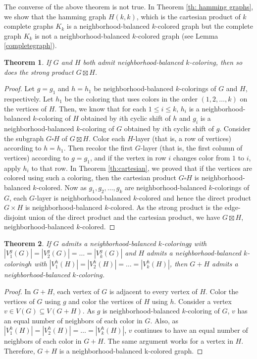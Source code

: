 \documentclass[12pt]{article}
\newtheorem{theorem}{Theorem}[section]
\newcommand{\nbc}{neighborhood-balanced $k$-coloring\xspace}
\newcommand{\nbcs}{neighborhood-balanced $k$-colorings\xspace}
\newcommand{\nbcd}{neighborhood-balanced $k$-colored\xspace}
\begin{document}
The converse of the above theorem is not true. In Theorem \ref{th: hamming graphs}, we show that the hamming graph $H(k,k)$, which is the cartesian product of $k$ complete graphs $K_k$ is  a \nbcd graph but the complete graph $K_k$ is not a \nbcd graph (see Lemma \ref{completegraph}).
\begin{theorem}
    If $G$ and $H$ both admit \nbc, then so does the strong product $G \boxtimes H$. 
\end{theorem}
\begin{proof}
     Let $g=g_1$ and $h=h_1$ be \nbcs of $G$ and $H$, respectively.
    Let $h_1$ be the coloring that uses colors in the order $(1, 2,  \dots, k)$ on the vertices of $H$.
    Then, we know that for each $1 \le i \le k$, $h_i$ is a \nbc of $H$ obtained by $i$th cyclic shift of $h$ and $g_i$ is a \nbc of $G$ obtained by $i$th cyclic shift of $g$.
    Consider the subgraph $G \square H$ of $G \boxtimes H$.
    Color each $H$-layer (that is, a row of vertices) according to $h=h_1$.
    Then recolor the first $G$-layer (that is, the first column of vertices) according to $g=g_1$, and if the vertex in row $i$ changes color from $1$ to $i$, apply $h_i$ to that row.
    In Theorem \ref{th:cartesian}, we proved that if the vertices are colored using such a coloring, then the cartesian product $G \square H$ is \nbcd.
    Now as $g_1, g_2,\dots,g_{k}$ are \nbcs of $G$, each $G$-layer is \nbcd  and hence the direct product $G \times H$ is \nbcd.
   As the strong product is the edge-disjoint union of the direct product and the cartesian product, we have $G \boxtimes H$, neighborhood-balanced $k$-colored.  
\end{proof}

\begin{theorem} \label{th:join}
    If $G$ admits a \nbc $g$ with 
    $|V^g_1(G)|=|V^g_2(G)|=\dots=|V^g_k(G)|$ and $H$ admits a \nbc $h$ with $|V^h_1(H)|=|V^h_2(H)|=\dots=|V^h_k(H)|$, then $G+H$ admits a \nbc.
\end{theorem}
\begin{proof}
  In $G+H$, each vertex of $G$ is adjacent to every vertex of $H$.
  Color the vertices of $G$ using $g$ and color the vertices of $H$  using $h$.
  Consider a vertex $v\in V(G) \subseteq V(G+H)$.
  As $g$ is \nbc of $G$, $v$ has an equal number of neighbors of each color in $G$.
  Also, as $|V^h_1(H)|=|V^h_2(H)|=\dots=|V^h_k(H)|$, $v$ continues to have an equal number of neighbors of each color in $G+H$.
  The same argument works for a vertex in $H$.
  Therefore, $G+H$ is a neighborhood-balanced k-colored graph.
\end{proof}
\end{document}
